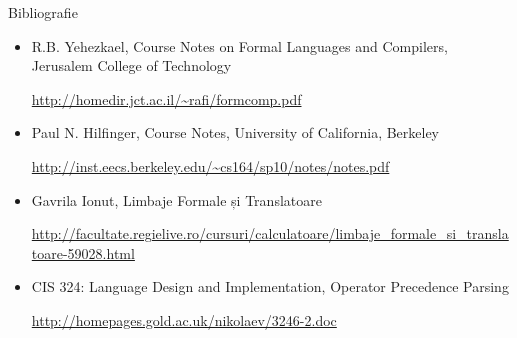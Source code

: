 \documentclass[pdf]{beamer}
\begin{document}
\begin{frame}{Bibliografie}
\begin{itemize}
\item
R.B. Yehezkael, Course Notes on Formal Languages and Compilers, Jerusalem College of Technology

\url{http://homedir.jct.ac.il/~rafi/formcomp.pdf}

\item
Paul N. Hilfinger, Course Notes, University of California, Berkeley

\url{http://inst.eecs.berkeley.edu/~cs164/sp10/notes/notes.pdf}

\item
Gavrila Ionut, Limbaje Formale și Translatoare

\url{http://facultate.regielive.ro/cursuri/calculatoare/limbaje_formale_si_translatoare-59028.html}

\item
CIS 324: Language Design and Implementation, Operator Precedence Parsing

\url{http://homepages.gold.ac.uk/nikolaev/3246-2.doc}
\end{itemize}
\end{frame}
\end{document}

